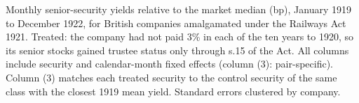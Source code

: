 Monthly senior-security yields relative to the market median (bp), January 1919 to December 1922, for British companies amalgamated under the Railways Act 1921. Treated: the company had not paid 3\% in each of the ten years to 1920, so its senior stocks gained trustee status only through s.15 of the Act. All columns include security and calendar-month fixed effects (column (3): pair-specific). Column (3) matches each treated security to the control security of the same class with the closest 1919 mean yield. Standard errors clustered by company.

